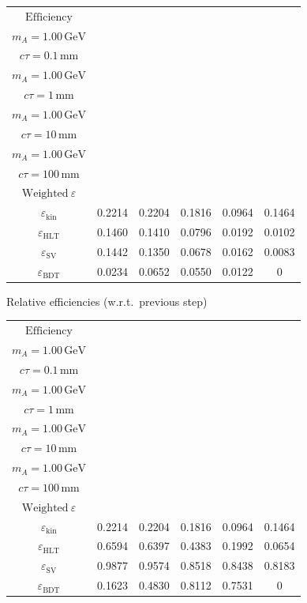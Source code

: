 \documentclass[10pt,a4paper]{article}
\begin{document}
{\begin{tabular}{cccccc}
\toprule
$\mathrm{Efficiency}$ & \shortstack{$m_{\pi}=10\,\mathrm{GeV}$\\$m_{A}=1.00\,\mathrm{GeV}$\\$c\tau=0.1\,\mathrm{mm}$} & \shortstack{$m_{\pi}=10\,\mathrm{GeV}$\\$m_{A}=1.00\,\mathrm{GeV}$\\$c\tau=1\,\mathrm{mm}$} & \shortstack{$m_{\pi}=10\,\mathrm{GeV}$\\$m_{A}=1.00\,\mathrm{GeV}$\\$c\tau=10\,\mathrm{mm}$} & \shortstack{$m_{\pi}=10\,\mathrm{GeV}$\\$m_{A}=1.00\,\mathrm{GeV}$\\$c\tau=100\,\mathrm{mm}$} & \shortstack{$\mathrm{QCD}$\\$\mathrm{Weighted}\ \varepsilon$} \\
\midrule
$\varepsilon_{\mathrm{kin}}$ & 0.2214 & 0.2204 & 0.1816 & 0.0964 & 0.1464\\
$\varepsilon_{\mathrm{HLT}}$ & 0.1460 & 0.1410 & 0.0796 & 0.0192 & 0.0102\\
$\varepsilon_{\mathrm{SV}}$ & 0.1442 & 0.1350 & 0.0678 & 0.0162 & 0.0083\\
$\varepsilon_{\mathrm{BDT}}$ & 0.0234 & 0.0652 & 0.0550 & 0.0122 & $0$\\
\bottomrule
\end{tabular}

\vspace{18pt}

Relative efficiencies (w.r.t.\ previous step)

\begin{tabular}{cccccc}
\toprule
$\mathrm{Efficiency}$ & \shortstack{$m_{\pi}=10\,\mathrm{GeV}$\\$m_{A}=1.00\,\mathrm{GeV}$\\$c\tau=0.1\,\mathrm{mm}$} & \shortstack{$m_{\pi}=10\,\mathrm{GeV}$\\$m_{A}=1.00\,\mathrm{GeV}$\\$c\tau=1\,\mathrm{mm}$} & \shortstack{$m_{\pi}=10\,\mathrm{GeV}$\\$m_{A}=1.00\,\mathrm{GeV}$\\$c\tau=10\,\mathrm{mm}$} & \shortstack{$m_{\pi}=10\,\mathrm{GeV}$\\$m_{A}=1.00\,\mathrm{GeV}$\\$c\tau=100\,\mathrm{mm}$} & \shortstack{$\mathrm{QCD}$\\$\mathrm{Weighted}\ \varepsilon$} \\
\midrule
$\varepsilon_{\mathrm{kin}}$ & 0.2214 & 0.2204 & 0.1816 & 0.0964 & 0.1464\\
$\varepsilon_{\mathrm{HLT}}$ & 0.6594 & 0.6397 & 0.4383 & 0.1992 & 0.0654\\
$\varepsilon_{\mathrm{SV}}$ & 0.9877 & 0.9574 & 0.8518 & 0.8438 & 0.8183\\
$\varepsilon_{\mathrm{BDT}}$ & 0.1623 & 0.4830 & 0.8112 & 0.7531 & $0$\\
\bottomrule
\end{tabular}

}
\end{document}
